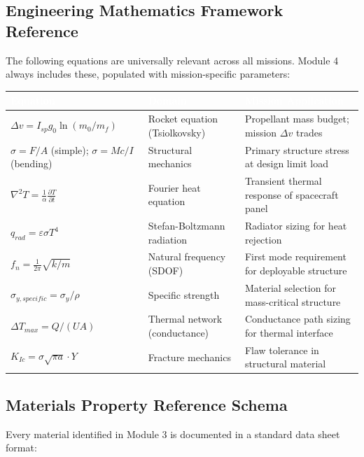 \documentclass[11pt,letterpaper]{article}
\newcommand{\tableheader}[1]{\textbf{\sffamily\textcolor{white}{#1}}}
\begin{document}
\subsection{Engineering Mathematics Framework Reference}

The following equations are universally relevant across all missions. Module 4 always includes these, populated with mission-specific parameters:

\begin{center}
\begin{tabularx}{\textwidth}{L{3cm}L{4cm}X}
\toprule
{}
\tableheader{Equation} & \tableheader{Domain} & \tableheader{Mission Application} \\
\midrule
$\Delta v = I_{sp} g_0 \ln(m_0/m_f)$ & Rocket equation (Tsiolkovsky) & Propellant mass budget; mission $\Delta v$ trades \\
$\sigma = F/A$ (simple); $\sigma = Mc/I$ (bending) & Structural mechanics & Primary structure stress at design limit load \\
$\nabla^2 T = \frac{1}{\alpha}\frac{\partial T}{\partial t}$ & Fourier heat equation & Transient thermal response of spacecraft panel \\
$q_{rad} = \varepsilon \sigma T^4$ & Stefan-Boltzmann radiation & Radiator sizing for heat rejection \\
$f_n = \frac{1}{2\pi}\sqrt{k/m}$ & Natural frequency (SDOF) & First mode requirement for deployable structure \\
$\sigma_{y,specific} = \sigma_y / \rho$ & Specific strength & Material selection for mass-critical structure \\
$\Delta T_{max} = Q/(UA)$ & Thermal network (conductance) & Conductance path sizing for thermal interface \\
$K_{Ic} = \sigma\sqrt{\pi a}\cdot Y$ & Fracture mechanics & Flaw tolerance in structural material \\
\bottomrule
\end{tabularx}
\end{center}

\subsection{Materials Property Reference Schema}

Every material identified in Module 3 is documented in a standard data sheet format:
\end{document}
